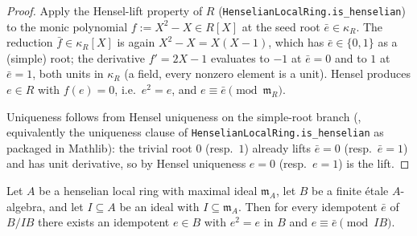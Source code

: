 \begin{proof}
Apply the Hensel-lift property of $R$
(\texttt{HenselianLocalRing.is\_henselian}) to the monic polynomial
$f := X^2 - X \in R[X]$ at the seed root $\bar e \in \kappa_R$.
The reduction $\bar f \in \kappa_R[X]$ is again $X^2 - X = X(X - 1)$,
which has $\bar e \in \{0, 1\}$ as a (simple) root; the derivative
$f' = 2X - 1$ evaluates to $-1$ at $\bar e = 0$ and to $1$ at
$\bar e = 1$, both units in $\kappa_R$ (a field, every nonzero
element is a unit). Hensel produces $e \in R$ with $f(e) = 0$,
i.e.\ $e^2 = e$, and $e \equiv \bar e \pmod{\mathfrak m_R}$.

Uniqueness follows from Hensel uniqueness on the simple-root branch
(, equivalently the uniqueness clause of
\texttt{HenselianLocalRing.is\_henselian} as packaged in Mathlib):
the trivial root $0$ (resp.\ $1$) already lifts $\bar e = 0$
(resp.\ $\bar e = 1$) and has unit derivative, so by Hensel
uniqueness $e = 0$ (resp.\ $e = 1$) is the lift.
\end{proof}

\begin{theorem}
\label{thm:henselianPair-idempotent-lift-limit-via-04gh}
Let $A$ be a henselian local ring with maximal ideal $\mathfrak m_A$,
let $B$ be a finite étale $A$-algebra, and let $I \subseteq A$ be an
ideal with $I \subseteq \mathfrak m_A$. Then for every idempotent
$\bar e$ of $B / IB$ there exists an idempotent $e \in B$ with
$e^2 = e$ in $B$ and $e \equiv \bar e \pmod{IB}$.
\end{theorem}

